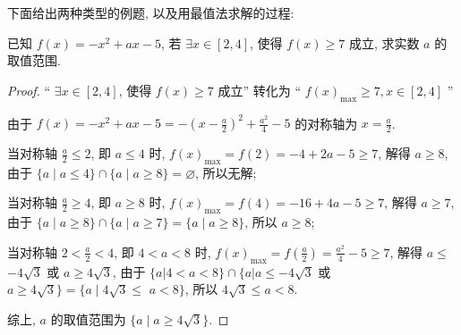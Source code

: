 下面给出两种类型的例题, 以及用最值法求解的过程:


\begin{variation}\label{variation:2.1.2.2}
  已知 \(f(x)  = -{x}^{2} + {ax}-5\), 若 \(\exists x \in  \left\lbrack  {2, 4}\right\rbrack\), 使得 \(f(x)  \geq  7\) 成立, 求实数 \(a\) 的取值范围.
\end{variation}
\begin{proof}
  “ \(\exists x \in  \left\lbrack  {2, 4}\right\rbrack\), 使得 \(f(x)  \geq  7\) 成立” 转化为 “ \(f{(x) }_{\max } \geq  7, x \in  \left\lbrack  {2, 4}\right\rbrack\) ”

由于 \(f(x)  = -{x}^{2} + {ax}-5 = -{\left( x-\frac{a}{2}\right) }^{2} + \frac{{a}^{2}}{4}-5\) 的对称轴为 \(x = \frac{a}{2}\).

当对称轴 \(\frac{a}{2} \leq  2\), 即 \(a \leq  4\) 时, \(f{(x) }_{\max } = f\left( 2\right)  = -4 + {2a}-5 \geq  7\), 解得 \(a \geq  8\), 由于 \(\{ a \mid  a \leq  4\}  \cap  \{ a \mid  a \geq  8\}  = \varnothing\), 所以无解;

当对称轴 \(\frac{a}{2} \geq  4\), 即 \(a \geq  8\) 时, \(f{(x) }_{\max } = f\left( 4\right)  = -{16} + {4a}-5 \geq  7\), 解得 \(a \geq  7\), 由于 \(\{ a \mid  a \geq  8\}  \cap  \{ a \mid  a \geq  7\}  = \{ a \mid  a \geq  8\}\), 所以 \(a \geq  8\);

当对称轴 \(2 < \frac{a}{2} < 4\), 即 \(4 < a < 8\) 时, \(f{(x) }_{\max } = f\left( \frac{a}{2}\right)  = \frac{{a}^{2}}{4}-5 \geq  7\), 解得 \(a \leq\)  \(-4\sqrt{3}\) 或 \(a \geq  4\sqrt{3}\), 由于 \(\{ a\left| {4 < a < 8\} \cap \{ a}\right| a \leq  -4\sqrt{3}\) 或 \(a \geq  4\sqrt{3}\}  = \{ a \mid  4\sqrt{3} \leq\)  \(a < 8\}\), 所以 \(4\sqrt{3} \leq  a < 8\).

综上, \(a\) 的取值范围为 \(\{ a \mid  a \geq  4\sqrt{3}\}\).
\end{proof}


